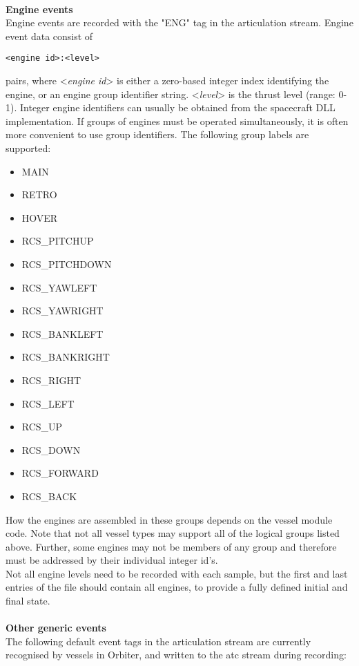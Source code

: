 \documentclass[Orbiter Technical Reference.tex]{subfiles}
\begin{document}
\noindent
\\
\textbf{Engine events}\\
Engine events are recorded with the "ENG" tag in the articulation stream. Engine event data consist of

\begin{lstlisting}[language=OSFS]
<engine id>:<level>
\end{lstlisting}

\noindent
pairs, where <\textit{engine id}> is either a zero-based integer index identifying the engine, or an engine group identifier string. <\textit{level}> is the thrust level (range: 0-1). Integer engine identifiers can usually be obtained from the spacecraft DLL implementation. If groups of engines must be operated simultaneously, it is often more convenient to use group identifiers. The following group labels are supported:

\begin{itemize}
\item MAIN
\item RETRO
\item HOVER
\item RCS\_PITCHUP
\item RCS\_PITCHDOWN
\item RCS\_YAWLEFT
\item RCS\_YAWRIGHT
\item RCS\_BANKLEFT
\item RCS\_BANKRIGHT
\item RCS\_RIGHT
\item RCS\_LEFT
\item RCS\_UP
\item RCS\_DOWN
\item RCS\_FORWARD
\item RCS\_BACK
\end{itemize}

\noindent
How the engines are assembled in these groups depends on the vessel module code. Note that not all vessel types may support all of the logical groups listed above. Further, some engines may not be members of any group and therefore must be addressed by their individual integer id's.\\
Not all engine levels need to be recorded with each sample, but the first and last entries of the file should contain all engines, to provide a fully defined initial and final state.\\
\\
\textbf{Other generic events}\\
The following default event tags in the articulation stream are currently recognised by vessels in Orbiter, and written to the atc stream during recording:
\end{document}
